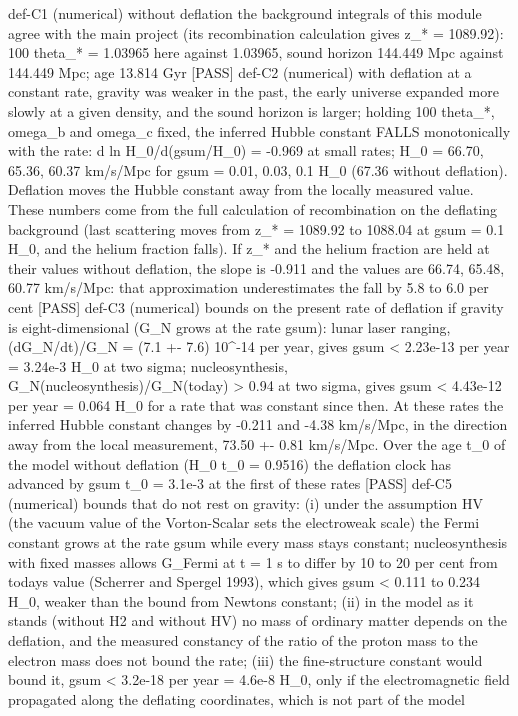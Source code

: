 \documentclass[
  10pt,
]{article}
\newenvironment{Shaded}{}{}
\newcommand{\NormalTok}[1]{#1}
\begin{document}
\begin{Shaded}
\begin{Highlighting}[]
\NormalTok{[PASS] def{-}C1  (numerical) without deflation the background integrals of this module agree with the main project (its recombination calculation gives z\_* = 1089.92): 100 theta\_* = 1.03965 here against 1.03965, sound horizon 144.449 Mpc against 144.449 Mpc; age 13.814 Gyr}
\NormalTok{[PASS] def{-}C2  (numerical) with deflation at a constant rate, gravity was weaker in the past, the early universe expanded more slowly at a given density, and the sound horizon is larger; holding 100 theta\_*, omega\_b and omega\_c fixed, the inferred Hubble constant FALLS monotonically with the rate: d ln H\_0/d(gsum/H\_0) = {-}0.969 at small rates; H\_0 = 66.70, 65.36, 60.37 km/s/Mpc for gsum = 0.01, 0.03, 0.1 H\_0 (67.36 without deflation). Deflation moves the Hubble constant away from the locally measured value. These numbers come from the full calculation of recombination on the deflating background (last scattering moves from z\_* = 1089.92 to 1088.04 at gsum = 0.1 H\_0, and the helium fraction falls). If z\_* and the helium fraction are held at their values without deflation, the slope is {-}0.911 and the values are 66.74, 65.48, 60.77 km/s/Mpc: that approximation underestimates the fall by 5.8 to 6.0 per cent}
\NormalTok{[PASS] def{-}C3  (numerical) bounds on the present rate of deflation if gravity is eight{-}dimensional (G\_N grows at the rate gsum): lunar laser ranging, (dG\_N/dt)/G\_N = (7.1 +{-} 7.6) 10\^{}{-}14 per year, gives gsum \textless{} 2.23e{-}13 per year = 3.24e{-}3 H\_0 at two sigma; nucleosynthesis, G\_N(nucleosynthesis)/G\_N(today) \textgreater{} 0.94 at two sigma, gives gsum \textless{} 4.43e{-}12 per year = 0.064 H\_0 for a rate that was constant since then. At these rates the inferred Hubble constant changes by {-}0.211 and {-}4.38 km/s/Mpc, in the direction away from the local measurement, 73.50 +{-} 0.81 km/s/Mpc. Over the age t\_0 of the model without deflation (H\_0 t\_0 = 0.9516) the deflation clock has advanced by gsum t\_0 = 3.1e{-}3 at the first of these rates}
\NormalTok{[PASS] def{-}C5  (numerical) bounds that do not rest on gravity: (i) under the assumption HV (the vacuum value of the Vorton{-}Scalar sets the electroweak scale) the Fermi constant grows at the rate gsum while every mass stays constant; nucleosynthesis with fixed masses allows G\_Fermi at t = 1 s to differ by 10 to 20 per cent from today\textquotesingle{}s value (Scherrer and Spergel 1993), which gives gsum \textless{} 0.111 to 0.234 H\_0, weaker than the bound from Newton\textquotesingle{}s constant; (ii) in the model as it stands (without H2 and without HV) no mass of ordinary matter depends on the deflation, and the measured constancy of the ratio of the proton mass to the electron mass does not bound the rate; (iii) the fine{-}structure constant would bound it, gsum \textless{} 3.2e{-}18 per year = 4.6e{-}8 H\_0, only if the electromagnetic field propagated along the deflating coordinates, which is not part of the model}

\end{Highlighting}
\end{Shaded}
\end{document}
